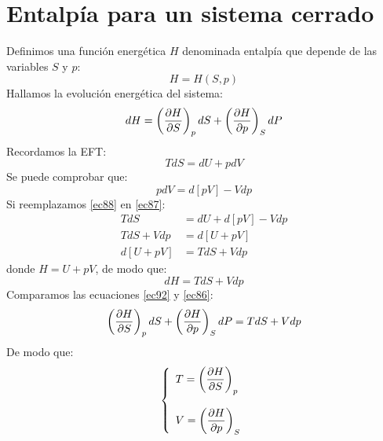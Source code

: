 \documentclass[../main]{subfiles}
\begin{document}
\section{Entalpía para un sistema cerrado}
Definimos una función energética $H$ denominada entalpía que depende de las variables $S$ y $p$:
\begin{equation}
    H=H(S,p)
\end{equation}
Hallamos la evolución energética del sistema:
\begin{equation}
    dH=\left( \pdv{H}{S}\right)_p dS+\left( \pdv{H}{p}\right)_S dP
    \label{ec86}
\end{equation}
Recordamos la EFT:
\begin{equation}
    TdS=dU+pdV
    \label{ec87}
\end{equation}
Se puede comprobar que:
\begin{equation}
    pdV=d[pV]-Vdp
    \label{ec88}
\end{equation}
Si reemplazamos \eqref{ec88} en \eqref{ec87}:
\begin{align}
    TdS &=dU+d[pV]-Vdp \\
    TdS+Vdp&=d[U+pV] \\
    d[U+pV]&=TdS+Vdp
\end{align}
donde $H=U+pV$, de modo que:
\begin{equation}
    dH=TdS+Vdp
    \label{ec92}
\end{equation}
Comparamos las ecuaciones \eqref{ec92} y \eqref{ec86}:
\begin{equation}
    \left( \pdv{H}{S}\right)_p dS+\left( \pdv{H}{p}\right)_S dP=TdS+Vdp
\end{equation}
De modo que:
\begin{equation}
    \left\{ 
    \begin{array}{l}
         T=\displaystyle \left( \pdv{H}{S} \right)_{p} \\ \\
         V=\displaystyle \left(\pdv{H}{p}\right)_{S} 
    \end{array} 
    \right. 
\end{equation}
\end{document}
